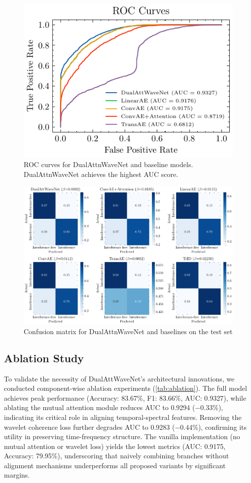 \documentclass[10pt, conference]{IEEEtran}
\begin{document}
\begin{figure}[t]
    \centering
    \includegraphics[width=0.8\linewidth]{roc-comparison.pdf}
    \caption{ROC curves for DualAttnWaveNet and baseline models. DualAttnWaveNet achieves the highest AUC score.}
    \label{fig:roc_comparison}
\end{figure}

\begin{figure}[t]
    \centering
    \includegraphics[width=\linewidth]{confusion.pdf}
    \caption{Confusion matrix for DualAttnWaveNet and baselines on the test set}
    \label{fig:confusion_matrix}
\end{figure}


\subsection{Ablation Study}

To validate the necessity of DualAttWaveNet’s architectural innovations, we conducted component-wise ablation experiments (\ref{tab:ablation}). The full model achieves peak performance (Accuracy: 83.67\%, F1: 83.66\%, AUC: 0.9327), while ablating the mutual attention module reduces AUC to 0.9294 (−0.33\%), indicating its critical role in aligning temporal-spectral features. Removing the wavelet coherence loss further degrades AUC to 0.9283 (−0.44\%), confirming its utility in preserving time-frequency structure. The vanilla implementation (no mutual attention or wavelet loss) yields the lowest metrics (AUC: 0.9175, Accuracy: 79.95\%), underscoring that naively combining branches without alignment mechanisms underperforms all proposed variants by significant margins.
\end{document}
